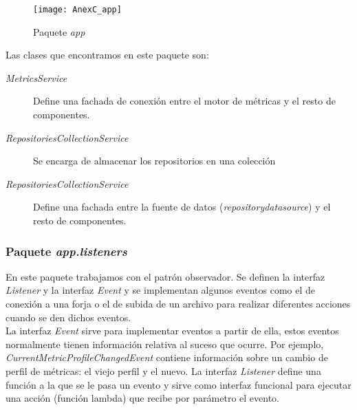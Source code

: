 \begin{figure}[!h]
	\centering
	\texttt{[image: AnexC\_app]}
	\caption{Paquete \textit{app}}\label{fig:AnexC_app}
\end{figure}
\FloatBarrier

Las clases que encontramos en este paquete son:

\begin{description}
	\item[\textit{MetricsService}] Define una fachada de conexión entre el motor de métricas y el resto de componentes.
	\item[\textit{RepositoriesCollectionService}] Se encarga de almacenar los repositorios en una colección
	\item[\textit{RepositoriesCollectionService}] Define una fachada entre la fuente de datos (\textit{repositorydatasource}) y el resto de componentes.
\end{description}

\subsubsection{Paquete \textit{app.listeners}}
En este paquete trabajamos con el patrón observador. Se definen la interfaz \textit{Listener} y la interfaz \textit{Event} y se implementan algunos eventos como el de conexión a una forja o el de subida de un archivo para realizar diferentes acciones cuando se den dichos eventos.\\ 
La interfaz \textit{Event} sirve para implementar eventos a partir de ella, estos eventos normalmente tienen información relativa al suceso que ocurre. Por ejemplo, \textit{CurrentMetricProfileChangedEvent} contiene información sobre un cambio de perfil de métricas: el viejo perfil y el nuevo. La interfaz \textit{Listener} define una función a la que se le pasa un evento y sirve como interfaz funcional para ejecutar una acción (función lambda) que recibe por parámetro el evento.
